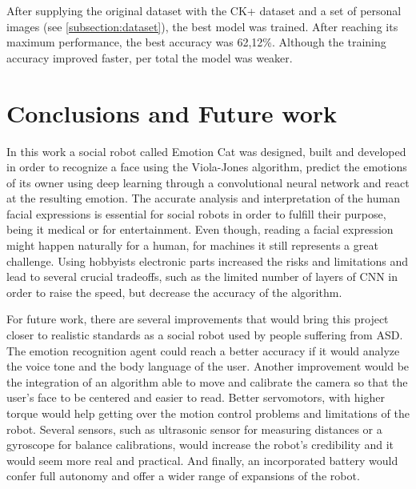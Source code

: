 \documentclass[runningheads,a4paper,12pt]{report}
\begin{document}
After supplying the original dataset with the CK+ dataset and a set of personal images (see \ref{subsection:dataset}), the best model was trained. After reaching its maximum performance, the best accuracy was 62,12\%. Although the training accuracy improved faster, per total the model was weaker. 

\chapter*{Conclusions and Future work}
In this work a social robot called Emotion Cat was designed, built and developed in order to recognize a face using the Viola-Jones algorithm, predict the emotions of its owner using deep learning through a convolutional neural network and react at the resulting emotion. The accurate analysis and interpretation of the human facial expressions is essential for social robots in order to fulfill their purpose, being it medical or for entertainment. Even though, reading a facial expression might happen naturally for a human, for machines it still represents a great challenge. Using hobbyists electronic parts increased the risks and limitations and lead to several crucial tradeoffs, such as the limited number of layers of CNN in order to raise the speed, but decrease the accuracy of the algorithm. 

For future work, there are several improvements that would bring this project closer to realistic standards as a social robot used by people suffering from ASD. The emotion recognition agent could reach a better accuracy if it would analyze the voice tone and the body language of the user. Another improvement would be the integration of an algorithm able to move and calibrate the camera so that the user's face to be centered and easier to read. Better servomotors, with higher torque would help getting over the motion control problems and limitations of the robot. Several sensors, such as ultrasonic sensor for measuring distances or a gyroscope for balance calibrations, would increase the robot's credibility and it would seem more real and practical. And finally, an incorporated battery would confer full autonomy and offer a wider range of expansions of the robot. 
\end{document}
